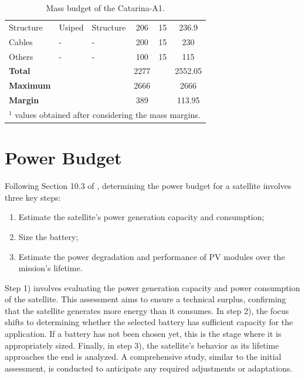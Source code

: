 \begin{table}[!ht]
\begin{tabular}{lllccc}
        Structure          & Usiped    & Structure         & 206 & 15 & 236.9 \\
        Cables             & -         & -                 & 200 & 15 & 230 \\
        Others             & -         & -                 & 100 & 15 & 115 \\
        \midrule
        \textbf{Total}     &           &                   & 2277 &   & 2552.05 \\
        \textbf{Maximum}   &           &                   & 2666 &   & 2666 \\
        \textbf{Margin}    &           &                   & 389  &   & 113.95 \\
        \bottomrule[1.5pt]
        \multicolumn{6}{l}{$^{1}$ values obtained after considering the mass margins.}
    \end{tabular}
    \caption{Mass budget of the Catarina-A1.}
    \label{tab:mass-budget}
\end{table}

\section{Power Budget} \label{power-budget}

Following Section 10.3 of \cite{larson2005}, determining the power budget for a satellite involves three key steps:

\begin{enumerate}
    \item Estimate the satellite's power generation capacity and consumption;
    \item Size the battery;
    \item Estimate the power degradation and performance of PV modules over the mission's lifetime.
\end{enumerate}

Step 1) involves evaluating the power generation capacity and power consumption of the satellite. This assessment aims to ensure a technical surplus, confirming that the satellite generates more energy than it consumes. In step 2), the focus shifts to determining whether the selected battery has sufficient capacity for the application. If a battery has not been chosen yet, this is the stage where it is appropriately sized. Finally, in step 3), the satellite's behavior as its lifetime approaches the end is analyzed. A comprehensive study, similar to the initial assessment, is conducted to anticipate any required adjustments or adaptations.


